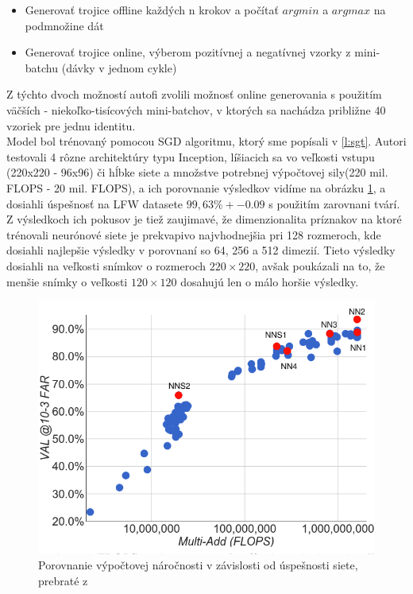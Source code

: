 \begin{itemize}
	\item Generovať trojice offline každých n krokov a počítať $ argmin $ a $ argmax $ na podmnožine dát
	\item Generovať trojice online, výberom pozitívnej a negatívnej vzorky z mini-batchu (dávky v jednom cykle) 
\end{itemize}

\indent Z týchto dvoch možností autofi zvolili možnosť online generovania s použitím väčších - niekoľko-tisícových mini-batchov, v ktorých sa nachádza približne 40 vzoriek pre jednu identitu. \\

\indent Model bol trénovaný pomocou SGD algoritmu, ktorý sme popísali v \ref{l:sgt}.
Autori testovali 4 rôzne architektúry typu Inception, líšiacich sa vo veľkosti vstupu (220x220 - 96x96) či hĺbke siete a množstve potrebnej výpočtovej sily(220 mil. FLOPS - 20 mil. FLOPS), a ich porovnanie výsledkov vidíme na obrázku \ref{fig:facenetflops}, a dosiahli úspešnosť na LFW datasete $ 99,63\% +- 0.09 $ s použitím zarovnani tvárí.
Z výsledkoch ich pokusov je tiež zaujimavé, že dimenzionalita príznakov na ktoré trénovali neurónové siete je prekvapivo najvhodnejšia pri 128 rozmeroch, kde dosiahli najlepšie výsledky v porovnaní so 64, 256 a 512 dimezií.
Tieto výsledky dosiahli na veľkosti snímkov o rozmeroch $ 220 \times 220 $, avšak poukázali na to, že menšie snímky o veľkosti $ 120 \times 120 $ dosahujú len o málo horšie výsledky.

\begin{figure}[H]
	\centering
	\includegraphics[width=.75\linewidth]{img/facenetflops}
	\caption{Porovnanie výpočtovej náročnosti v závislosti od úspešnosti siete, prebraté z\cite[p.~5]{schroff2015facenet}}
	\label{fig:facenetflops}
\end{figure}

